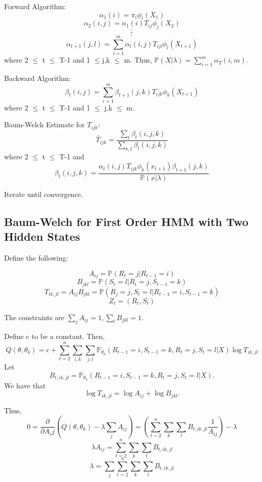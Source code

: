 \documentclass{article} %
\begin{document}
Forward Algorithm: \newline
$$\alpha_1(i) = \pi_i \phi_i(X_1)$$
$$\alpha_2(i,j) = \alpha_1(i) T_{ij} \phi_j(X_2)$$
$$:$$
$$:$$
$$\alpha_{t+1}(j, l) = \sum_{i=1}^m \alpha_t(i,j) T_{ijl} \phi_l(X_{t+1})$$
where 2 $\leq$ t $\leq$ T-1 and 1 $\leq$j,k $\leq$  m. \newline
Thus, $\mathbb{P}(X | \lambda) = \sum_{i=1}^m \alpha_T(i,m)$. \newline

Backward Algorithm: \newline
$$\beta_t(i,j) = \sum_{i=1}^m \beta_{t+1}(j,k) T_{ijk} \phi_k(X_{t+1})$$
where 2 $\leq$ t $\leq$ T-1 and 1 $\leq$ j,k $\leq$ m. \newline

Baum-Welch Estimate for $T_{ijk}$: \newline
$$\bar{T}_{ijk} = \frac{\sum_t \beta_t (i,j,k)}{\sum_{k,t} \beta_t (i,j,k)}$$
where 2 $\leq$ t $\leq$ T-1 and \newline
$$\beta_t(i,j,k) = \frac{\alpha_t(i,j) T_{ijk} \phi_k(x_{t+1}) \beta_{t+1}(j,k)}{\mathbb{P}(x|\lambda)}$$ 




Iterate until convergence. 

\subsection{Baum-Welch for First Order HMM with Two Hidden States}
\label{3rdHMM}
Define the following:

$$A_{ij} = \mathbb{P} (R_t = j | R_{t-1} = i)$$
$$B_{jkl} = \mathbb{P} (S_t = l | R_t = j, S_{t-1} = k)$$ 
$$T_{ik, jl} = A_{ij} B_{jkl} = \mathbb{P} (R_j = j, S_t = l | R_{t-1} = i, S_{t-1} = k)$$
$$Z_t = (R_t, S_t)$$

The constraints are $\sum_j A_{ij} = 1, \sum_l B_{jkl} = 1.$ \newline

Define c to be a constant. Then,  \newline
$$Q(\theta, \theta_k) = c + \sum_{t=2}^n \sum_{i,k} \sum_{j,l} \mathbb{P}_{\theta_k} (R_{t-1} = i, S_{t-1} = k, R_t = j, S_t = l | X) \log T_{ik, jl}$$ 
Let $$B_{t,ik,jl} = \mathbb{P}_{\theta_k} (R_{t-1} = i, S_{t-1} = k, R_t = j, S_t = l | X).$$ We have that $$\log T_{ik, jl} = \log A_{ij} + \log B_{jkl}.$$

Thus, \newline
$$ 0 = \frac{\partial}{\partial A_ij}(Q(\theta, \theta_k) - \lambda \sum_{j} A_{ij}) = (\sum_{t=2}^n \sum_k \sum_l B_{t,ik,jl} \frac{1}{A_{ij}}) - \lambda$$
$$\lambda A_{ij} = \sum_{t=2}^n \sum_k \sum_l B_{t,ik,jl}$$
$$\lambda = \sum_j \sum_{t=2}^n \sum_k \sum_l B_{t,ik,jl}$$
\end{document}
